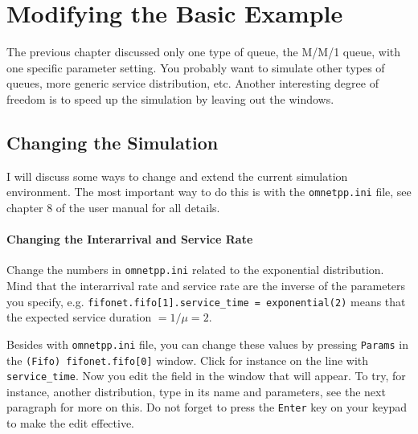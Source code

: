 \documentclass[a4paper]{article}
\begin{document}
\section{Modifying the Basic Example}
\label{sec:next-steps}
The previous chapter discussed only one type of queue, the M/M/1
queue, with one specific parameter setting. You probably want to
simulate other types of queues, more generic service distribution,
etc. Another interesting degree of freedom is to speed up the
simulation by leaving out the windows.

\subsection{Changing the  Simulation}
\label{sec:changing-basic-mm1}
I will discuss some ways to change and extend the current simulation
environment. The most important way to do this is with the
\texttt{omnetpp.ini} file, see chapter 8 of the user manual for all
details.

\paragraph{Changing the Interarrival and Service Rate}
\label{sec:chang-inter-serv}
Change the numbers in \texttt{omnetpp.ini} related to the exponential
distribution. Mind that the interarrival rate and service rate are the
inverse of the parameters you specify, e.g.
\texttt{fifonet.fifo[1].service\_time = exponential(2)} means that the
expected service duration $ = 1/\mu = 2$.

Besides with \texttt{omnetpp.ini} file, you can change these values by
pressing \texttt{Params} in the \texttt{(Fifo) fifonet.fifo[0]} window.
Click for instance on the line with \texttt{service\_time}. Now you
edit the field in the window that will appear. To try, for instance,
another distribution, type in its name and parameters, see the next
paragraph for more on this.  Do not forget to press the \texttt{Enter}
key on your keypad to make the edit effective.
\end{document}
